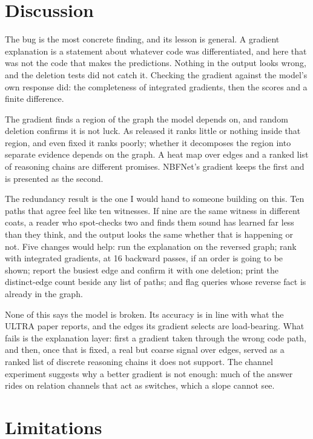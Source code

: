 \documentclass[10pt,twocolumn,letterpaper]{article}
\begin{document}
\section{Discussion}

The bug is the most concrete finding, and its lesson is general. A gradient
explanation is a statement about whatever code was differentiated, and here
that was not the code that makes the predictions. Nothing in the output looks
wrong, and the deletion tests did not catch it. Checking the gradient against
the model's own response did: the completeness of integrated gradients, then
the scores and a finite difference.

The gradient finds a region of the graph the model depends on, and random
deletion confirms it is not luck. As released it ranks little or nothing
inside that region, and even fixed it ranks poorly; whether it decomposes the
region into separate evidence depends on the graph. A heat map over edges and a ranked list of reasoning chains are
different promises. NBFNet's gradient keeps the first and is presented as the
second.

The redundancy result is the one I would hand to someone building on this. Ten
paths that agree feel like ten witnesses. If nine are the same witness in
different coats, a reader who spot-checks two and finds them sound has learned
far less than they think, and the output looks the same whether that is
happening or not. Five changes would help: run the explanation on the reversed
graph; rank with integrated gradients, at 16 backward passes, if an order is
going to be shown; report the busiest edge and confirm it with one deletion;
print the distinct-edge count beside any list of paths; and flag queries whose
reverse fact is already in the graph.

None of this says the model is broken. Its accuracy is in line with what the
ULTRA paper reports, and the edges its gradient selects are load-bearing. What
fails is the explanation layer: first a gradient taken through the wrong code
path, and then, once that is fixed, a real but coarse signal over edges,
served as a ranked list of discrete reasoning chains it does not support. The
channel experiment suggests why a better gradient is not enough: much of the
answer rides on relation channels that act as switches, which a slope cannot
see.

\section{Limitations}
\end{document}
